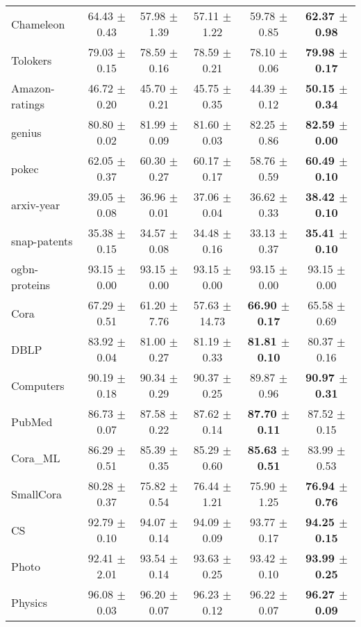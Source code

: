 \begin{table}[t]
\begin{sc}
{\begin{tabular}{@{}l|c|cccc@{}}
Chameleon & 64.43 $\pm$ 0.43 & 57.98 $\pm$ 1.39 & 57.11 $\pm$ 1.22 & 59.78 $\pm$ 0.85 & \textbf{62.37 $\pm$ 0.98} \\
Tolokers & 79.03 $\pm$ 0.15 & 78.59 $\pm$ 0.16 & 78.59 $\pm$ 0.21 & 78.10 $\pm$ 0.06 & \textbf{79.98 $\pm$ 0.17} \\
Amazon-ratings & 46.72 $\pm$ 0.20 & 45.70 $\pm$ 0.21 & 45.75 $\pm$ 0.35 & 44.39 $\pm$ 0.12 & \textbf{50.15 $\pm$ 0.34} \\
genius & 80.80 $\pm$ 0.02 & 81.99 $\pm$ 0.09 & 81.60 $\pm$ 0.03 & 82.25 $\pm$ 0.86 & \textbf{82.59 $\pm$ 0.00} \\
pokec & 62.05 $\pm$ 0.37 & 60.30 $\pm$ 0.27 & 60.17 $\pm$ 0.17 & 58.76 $\pm$ 0.59 & \textbf{60.49 $\pm$ 0.10} \\
arxiv-year & 39.05 $\pm$ 0.08 & 36.96 $\pm$ 0.01 & 37.06 $\pm$ 0.04 & 36.62 $\pm$ 0.33 & \textbf{38.42 $\pm$ 0.10} \\
snap-patents & 35.38 $\pm$ 0.15 & 34.57 $\pm$ 0.08 & 34.48 $\pm$ 0.16 & 33.13 $\pm$ 0.37 & \textbf{35.41 $\pm$ 0.10} \\
ogbn-proteins & 93.15 $\pm$ 0.00 & 93.15 $\pm$ 0.00 & 93.15 $\pm$ 0.00 & 93.15 $\pm$ 0.00 & 93.15 $\pm$ 0.00 \\\midrule \midrule
Cora & 67.29 $\pm$ 0.51 & 61.20 $\pm$ 7.76 & 57.63 $\pm$ 14.73 & \textbf{66.90 $\pm$ 0.17} & 65.58 $\pm$ 0.69 \\
DBLP & 83.92 $\pm$ 0.04 & 81.00 $\pm$ 0.27 & 81.19 $\pm$ 0.33 & \textbf{81.81 $\pm$ 0.10} & 80.37 $\pm$ 0.16 \\
Computers & 90.19 $\pm$ 0.18 & 90.34 $\pm$ 0.29 & 90.37 $\pm$ 0.25 & 89.87 $\pm$ 0.96 & \textbf{90.97 $\pm$ 0.31} \\
PubMed & 86.73 $\pm$ 0.07 & 87.58 $\pm$ 0.22 & 87.62 $\pm$ 0.14 & \textbf{87.70 $\pm$ 0.11} & 87.52 $\pm$ 0.15 \\
Cora\_ML & 86.29 $\pm$ 0.51 & 85.39 $\pm$ 0.35 & 85.29 $\pm$ 0.60 & \textbf{85.63 $\pm$ 0.51} & 83.99 $\pm$ 0.53 \\
SmallCora & 80.28 $\pm$ 0.37 & 75.82 $\pm$ 0.54 & 76.44 $\pm$ 1.21 & 75.90 $\pm$ 1.25 & \textbf{76.94 $\pm$ 0.76} \\
CS & 92.79 $\pm$ 0.10 & 94.07 $\pm$ 0.14 & 94.09 $\pm$ 0.09 & 93.77 $\pm$ 0.17 & \textbf{94.25 $\pm$ 0.15} \\
Photo & 92.41 $\pm$ 2.01 & 93.54 $\pm$ 0.14 & 93.63 $\pm$ 0.25 & 93.42 $\pm$ 0.10 & \textbf{93.99 $\pm$ 0.25} \\
Physics & 96.08 $\pm$ 0.03 & 96.20 $\pm$ 0.07 & 96.23 $\pm$ 0.12 & 96.22 $\pm$ 0.07 & \textbf{96.27 $\pm$ 0.09} \\

\end{tabular}}
\end{sc}
\end{table}
